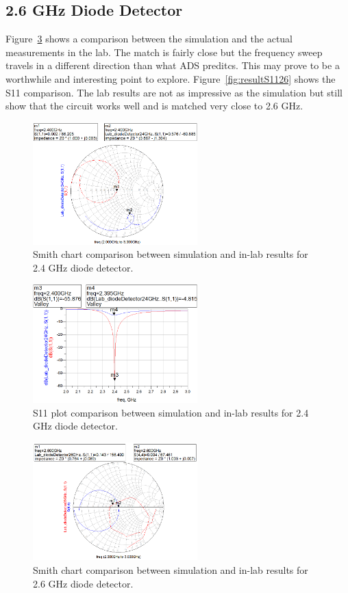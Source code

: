 \documentclass[conference]{IEEEtran}
\begin{document}
\subsection{2.6 GHz Diode Detector}
 Figure~\ref{fig:resultSmith26} shows a comparison between the simulation and the actual measurements in the lab.  The match is fairly close but the frequency sweep travels in a different direction than what ADS preditcs.  This may prove to be a worthwhile and interesting point to explore. Figure~\ref{fig:resultS1126} shows the S11 comparison.  The lab results are not as impressive as the simulation but still show that the circuit works well and is matched very close to 2.6 GHz.

\begin{figure}[!htb]
\centering
\includegraphics[width=2.5in]{diode-pics/diodedetectorLab24Smith.png}
\caption{Smith chart comparison between simulation and in-lab results for 2.4 GHz diode detector.}
\label{fig:resultSmith24}
\end{figure}

\begin{figure}[!htb]
\centering
\includegraphics[width=2.5in]{diode-pics/diodedetectorLab24S11.png}
\caption{S11 plot comparison between simulation and in-lab results for 2.4 GHz diode detector.}
\label{fig:resultS1124}
\end{figure}

\begin{figure}[!htb]
\centering
\includegraphics[width=2.5in]{diode-pics/diodedetectorLab26Smith.png}
\caption{Smith chart comparison between simulation and in-lab results for 2.6 GHz diode detector.}
\label{fig:resultSmith26}
\end{figure}
\end{document}
